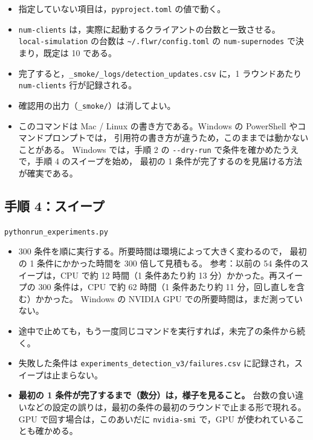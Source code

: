\documentclass[a4j, dvipdfmx]{jsarticle}  %
\newenvironment{cmd}{\par\vspace{0.3em}\begin{alltt}\small}{\end{alltt}\vspace{0.3em}\par}
\begin{document}
\begin{itemize}
  \item 指定していない項目は，\texttt{pyproject.toml} の値で動く。
  \item \texttt{num-clients} は，実際に起動するクライアントの台数と一致させる。
        \texttt{local-simulation} の台数は \texttt{\textasciitilde/.flwr/config.toml} の \texttt{num-supernodes} で決まり，既定は 10 である。
  \item 完了すると，\texttt{\_smoke/\_logs/detection\_updates.csv} に，1 ラウンドあたり \texttt{num-clients} 行が記録される。
  \item 確認用の出力（\texttt{\_smoke/}）は消してよい。
  \item このコマンドは Mac / Linux の書き方である。Windows の PowerShell やコマンドプロンプトでは，
        引用符の書き方が違うため，このままでは動かないことがある。
        Windows では，手順 2 の \texttt{-{}-dry-run} で条件を確かめたうえで，手順 4 のスイープを始め，
        最初の 1 条件が完了するのを見届ける方法が確実である。
\end{itemize}

\subsection{手順 4：スイープ}

\begin{cmd}
python run_experiments.py
\end{cmd}

\begin{itemize}
  \item 300 条件を順に実行する。所要時間は環境によって大きく変わるので，
        最初の 1 条件にかかった時間を 300 倍して見積もる。
        参考：以前の 54 条件のスイープは，CPU で約 12 時間（1 条件あたり約 13 分）かかった。再スイープの 300 条件は，CPU で約 62 時間（1 条件あたり約 11 分，回し直しを含む）かかった。
        Windows の NVIDIA GPU での所要時間は，まだ測っていない。
  \item 途中で止めても，もう一度同じコマンドを実行すれば，未完了の条件から続く。
  \item 失敗した条件は \texttt{experiments\_detection\_v3/failures.csv} に記録され，スイープは止まらない。
  \item \textbf{最初の 1 条件が完了するまで（数分）は，様子を見ること。}
        台数の食い違いなどの設定の誤りは，最初の条件の最初のラウンドで止まる形で現れる。
        GPU で回す場合は，このあいだに \texttt{nvidia-smi} で，GPU が使われていることも確かめる。
\end{itemize}
\end{document}
